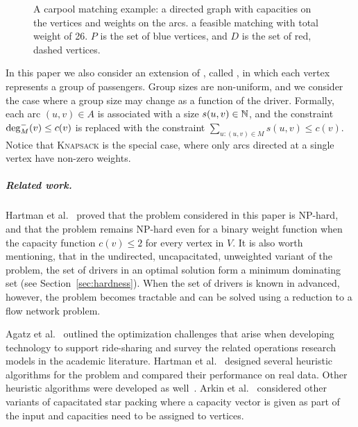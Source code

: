 \begin{figure}
\centering

\caption[]{
\label{fig:carpool}
A carpool matching example: 
a directed graph with capacities on the vertices and weights on the arcs. 
a feasible matching with total weight of 26.
$P$ is the set of blue vertices, and $D$ is the set of red, dashed vertices. 
}
\end{figure}  

In this paper we also consider an extension of \carpool, called \gcp,
in which each vertex represents a group of passengers.  Group sizes
are non-uniform, and we consider the case where a group size may
change as a function of the driver.  Formally, each arc $(u,v) \in A$
is associated with a size $s(u,v) \in \N$, and the constraint
$\din[M](v) \leq c(v)$ is replaced with the constraint
$\sum_{u:(u,v) \in M} s(u,v) \leq c(v)$.
%
Notice that \textsc{Knapsack} is the special case, where only arcs
directed at a single vertex have non-zero weights.


\subparagraph{Related work.}
%
Hartman et al.~\cite{hartman2013optimal} proved that the \carpool
problem considered in this paper is NP-hard, and that the problem
remains NP-hard even for a binary weight function when the capacity
function $c(v) \leq 2$ for every vertex in $V$.  It is also worth
mentioning, that in the undirected, uncapacitated, unweighted variant
of the problem, the set of drivers in an optimal solution form a
minimum dominating set (see Section~\ref{sec:hardness}).  When the set
of drivers is known in advanced, however, the problem becomes
tractable and can be solved using a reduction to a flow network
problem.

Agatz et al.~\cite{agatz2012optimization} outlined the optimization
challenges that arise when developing technology to support
ride-sharing and survey the related operations research models in the
academic literature.  Hartman et al.~\cite{hartman2014theory} designed
several heuristic algorithms for the \carpool problem and compared
their performance on real data.  Other heuristic algorithms were
developed as well~\cite{knapen2014exploiting}.  Arkin et
al.~\cite{arkin2004approximations} considered other variants of
capacitated star packing where a capacity vector is given as part of
the input and capacities need to be assigned to vertices.

